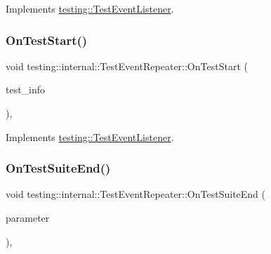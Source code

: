 Implements \mbox{\hyperlink{classtesting_1_1_test_event_listener_ab4f6a0ca16ae75daf385b3b5914e1048}{testing\+::\+Test\+Event\+Listener}}.

\mbox{\label{classtesting_1_1internal_1_1_test_event_repeater_a4522c01f10f98d9e5bd97c7e94f3d2bf}} 
\subsubsection{\texorpdfstring{OnTestStart()}{OnTestStart()}\hspace{0.1cm}{\footnotesize\ttfamily [3/3]}}
{\footnotesize\ttfamily void testing\+::internal\+::\+Test\+Event\+Repeater\+::\+On\+Test\+Start (\begin{DoxyParamCaption}\item[{const \mbox{\hyperlink{classtesting_1_1_test_info}{Test\+Info}} \&}]{test\+\_\+info }\end{DoxyParamCaption})\hspace{0.3cm}{\ttfamily [override]}, {\ttfamily [virtual]}}



Implements \mbox{\hyperlink{classtesting_1_1_test_event_listener_ab4f6a0ca16ae75daf385b3b5914e1048}{testing\+::\+Test\+Event\+Listener}}.

\mbox{\label{classtesting_1_1internal_1_1_test_event_repeater_a59e442d1f79ea186499ef99284a60d4c}} 
\subsubsection{\texorpdfstring{OnTestSuiteEnd()}{OnTestSuiteEnd()}\hspace{0.1cm}{\footnotesize\ttfamily [1/2]}}
{\footnotesize\ttfamily void testing\+::internal\+::\+Test\+Event\+Repeater\+::\+On\+Test\+Suite\+End (\begin{DoxyParamCaption}\item[{const \mbox{\hyperlink{classtesting_1_1_test_suite}{Test\+Suite}} \&}]{parameter }\end{DoxyParamCaption})\hspace{0.3cm}{\ttfamily [override]}, {\ttfamily [virtual]}}



